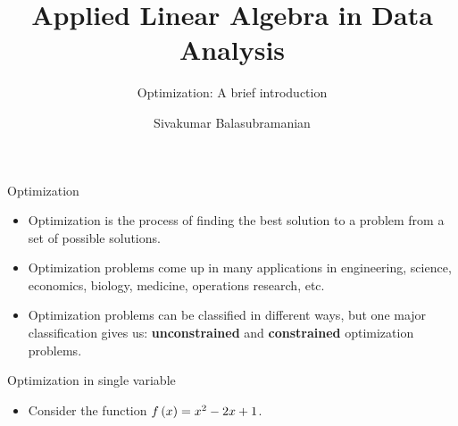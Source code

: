 \documentclass[aspectratio=169]{beamer}
\title{Applied Linear Algebra in Data Analysis}
\subtitle{Optimization: A brief introduction}
\author{Sivakumar Balasubramanian}
\institute[Christian Medical College] %
{
  \inst{}%
  Department of Bioengineering\\
  Christian Medical College, Bagayam\\
  Vellore 632002
}
\date{}
\let\olditem\item
\renewcommand{\item}{\setlength{\itemsep}{\fill}\olditem}
\def\mf{\ensuremath\mathbf}
\def\mb{\ensuremath\mathbb}
\def\lp{\ensuremath\left(}
\def\rp{\ensuremath\right)}
\def\lc{\ensuremath\left\{}
\def\rc{\ensuremath\right\}}
\newcommand{\ct}[1]{\lp #1\rp}
\begin{document}


\begin{frame}
  \titlepage
\end{frame}



\begin{frame}[t]{Optimization}
\begin{itemize}
  \item Optimization is the process of finding the best solution to a problem from a set of possible solutions.
  \item Optimization problems come up in many applications in engineering, science, economics, biology, medicine, operations research, etc.
  \item Optimization problems can be classified in different ways, but one major classification gives us: \textbf{unconstrained} and \textbf{constrained} optimization problems.
\end{itemize}
\end{frame}


\begin{frame}[t]{Optimization in single variable}
\begin{itemize}
  \item Consider the function $f\ct{x} = x^2 - 2x + 1$.
\end{itemize}
\end{frame}
\end{document}
